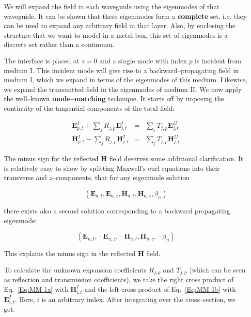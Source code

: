 We will expand the field in each waveguide using the eigenmodes of that waveguide. It can be shown that these eigenmodes form a \textbf{complete} set, i.e. they can be used to expand any arbitrary field in that layer. Also, by enclosing the structure that we want to model in a metal box, this set of eigenmodes is a discrete set rather than a continuum.

The interface is placed at $z=0$ and a single mode with index $p$ is incident
from medium I. This incident mode will give rise to a backward--propagating field
in medium I, which we expand in terms of the eigenmodes of this medium. Likewise,
we expand the transmitted field in the eigenmodes of medium II. We now apply the well--known \textbf{mode--matching} technique. It starts off by imposing the continuity of the tangential components of the
total field: 

\begin{eqnarray}
\mathbf{E}^{I}_{p,t}+\sum _{j}R_{j,p}\mathbf{E}^{I}_{j,t} & = & \sum _{j}T_{j,p}\mathbf{E}^{II}_{j,t}\label{Eq:MM 1a} \\
\mathbf{H}^{I}_{p,t}-\sum _{j}R_{j,p}\mathbf{H}^{I}_{j,t} & = & \sum _{j}T_{j,p}\mathbf{H}^{II}_{j,t}\label{Eq:MM 1b} 
\end{eqnarray}

The minus sign for the reflected ${\mathbf H}$ field deserves some additional clarification. It is relatively easy to show by splitting Maxwell's curl equations into their transverse and $z$--components, that for any eigenmode solution 

\begin{equation}
\label{Eq:eigen fw}
\left( \mathbf{E}_{n,t},\mathbf{E}_{n,z},\mathbf{H}_{n,t},\mathbf{H}_{n,z},\beta _{n}\right) 
\end{equation}

there exists also a second solution corresponding to a backward propagating eigenmode:

\begin{equation}
\label{Eq:eigen bw}
\left( \mathbf{E}_{n,t},-\mathbf{E}_{n,z},-\mathbf{H}_{n,t},\mathbf{H}_{n,z},-\beta _{n}\right) 
\end{equation}

This explains the minus sign in the reflected ${\mathbf H}$ field.

To calculate the unknown expansion coefficients $R_{j,p}$ and $T_{j,p}$
(which can be seen as reflection and transmission coefficients), we take the
right cross product of Eq.~\ref{Eq:MM 1a} with $\mathbf{H}^{I}_{i,t}$
and the left cross product of Eq.~\ref{Eq:MM 1b} with $\mathbf{E}^{I}_{i,t}$.
Here, $i$ is an arbitrary index. After integrating over the cross--section,
we get:

